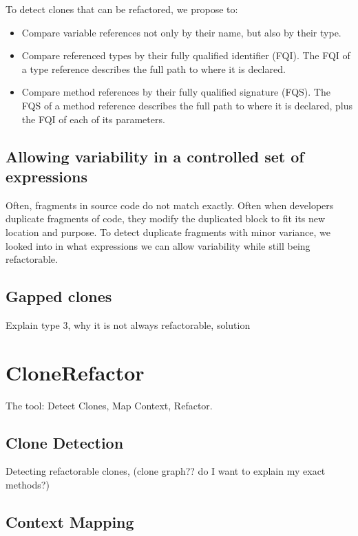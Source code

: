 \documentclass[conference]{IEEEtran}
\begin{document}
To detect clones that can be refactored, we propose to:
\begin{itemize}
  \item Compare variable references not only by their name, but also by their type.
  \item Compare referenced types by their fully qualified identifier (FQI). The FQI of a type reference describes the full path to where it is declared.
  \item Compare method references by their fully qualified signature (FQS). The FQS of a method reference describes the full path to where it is declared, plus the FQI of each of its parameters.
\end{itemize}


\subsection{Allowing variability in a controlled set of expressions}
Often, fragments in source code do not match exactly. Often when developers duplicate fragments of code, they modify the duplicated block to fit its new location and purpose. To detect duplicate fragments with minor variance, we looked into in what expressions we can allow variability while still being refactorable.

\subsection{Gapped clones}
Explain type 3, why it is not always refactorable, solution

\section{CloneRefactor}
The tool: Detect Clones, Map Context, Refactor.

\subsection{Clone Detection}
Detecting refactorable clones, (clone graph?? do I want to explain my exact methods?)

\subsection{Context Mapping}
\end{document}
